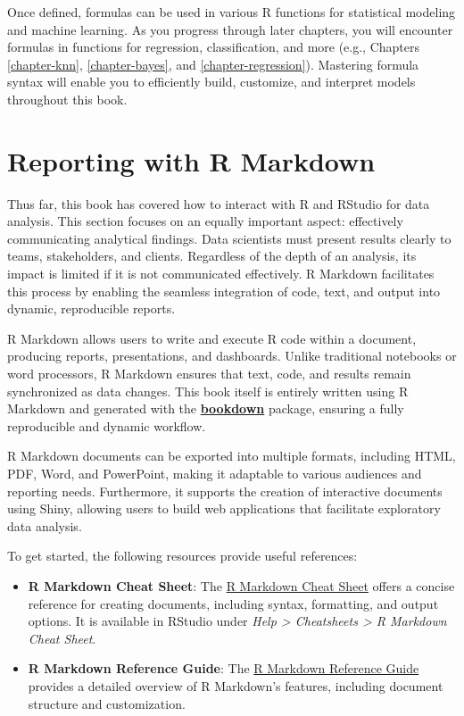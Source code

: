 \documentclass[
  11pt,
]{book}
\providecommand{\tightlist}{%
  \setlength{\itemsep}{0pt}\setlength{\parskip}{0pt}}
\theoremstyle{definition}
\theoremstyle{definition}
\theoremstyle{definition}
\theoremstyle{definition}
\theoremstyle{remark}
\begin{document}
Once defined, formulas can be used in various R functions for statistical modeling and machine learning. As you progress through later chapters, you will encounter formulas in functions for regression, classification, and more (e.g., Chapters \ref{chapter-knn}, \ref{chapter-bayes}, and \ref{chapter-regression}). Mastering formula syntax will enable you to efficiently build, customize, and interpret models throughout this book.

\section{Reporting with R Markdown}\label{reporting-with-r-markdown}

Thus far, this book has covered how to interact with R and RStudio for data analysis. This section focuses on an equally important aspect: effectively communicating analytical findings. Data scientists must present results clearly to teams, stakeholders, and clients. Regardless of the depth of an analysis, its impact is limited if it is not communicated effectively. R Markdown facilitates this process by enabling the seamless integration of code, text, and output into dynamic, reproducible reports.

R Markdown allows users to write and execute R code within a document, producing reports, presentations, and dashboards. Unlike traditional notebooks or word processors, R Markdown ensures that text, code, and results remain synchronized as data changes. This book itself is entirely written using R Markdown and generated with the \href{https://bookdown.org}{\textbf{bookdown}} package, ensuring a fully reproducible and dynamic workflow.

R Markdown documents can be exported into multiple formats, including HTML, PDF, Word, and PowerPoint, making it adaptable to various audiences and reporting needs. Furthermore, it supports the creation of interactive documents using Shiny, allowing users to build web applications that facilitate exploratory data analysis.

To get started, the following resources provide useful references:

\begin{itemize}
\tightlist
\item
  \textbf{R Markdown Cheat Sheet}: The \href{https://rstudio.com/wp-content/uploads/2016/03/rmarkdown-cheatsheet-2.0.pdf}{R Markdown Cheat Sheet} offers a concise reference for creating documents, including syntax, formatting, and output options. It is available in RStudio under \emph{Help \textgreater{} Cheatsheets \textgreater{} R Markdown Cheat Sheet}.\\
\item
  \textbf{R Markdown Reference Guide}: The \href{https://rstudio.com/wp-content/uploads/2015/03/rmarkdown-reference.pdf}{R Markdown Reference Guide} provides a detailed overview of R Markdown's features, including document structure and customization.
\end{itemize}
\end{document}
